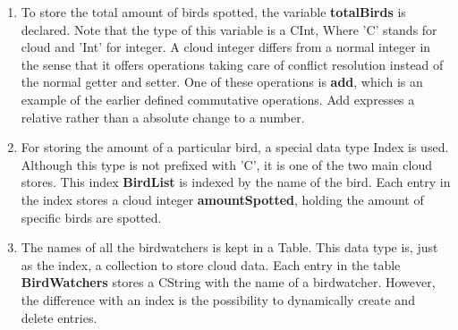 \documentclass[a4paper,12pt]{report}
\begin{document}
\begin{enumerate}
 \item To store the total amount of birds spotted, the variable \textbf{totalBirds} is declared. Note that the type of this variable is a \textcolor{codedarkblue}{CInt}, Where 'C' stands for cloud and 'Int' for integer. A cloud integer differs from a normal integer in the sense that it offers operations taking care of conflict resolution instead of the normal getter and setter. One of these operations is \textbf{add}, which is an example of the earlier defined commutative operations. Add expresses a relative rather than a absolute change to a number.
 \item For storing the amount of a particular bird, a special data type \textcolor{codeblue}{Index} is used. Although this type is not prefixed with 'C', it is one of the two main cloud stores. This index \textbf{BirdList} is indexed by the name of the bird. Each entry in the index stores a cloud integer \textbf{amountSpotted}, holding the amount of specific birds are spotted. 
 \item The names of all the birdwatchers is kept in a \textcolor{codeblue}{Table}. This data type is, just as the index, a collection to store cloud data. Each entry in the table \textbf{BirdWatchers} stores a \textcolor{codedarkblue}{CString} with the name of a birdwatcher. However, the difference with an index is the possibility to dynamically create and delete entries.
\end{enumerate}
\end{document}
